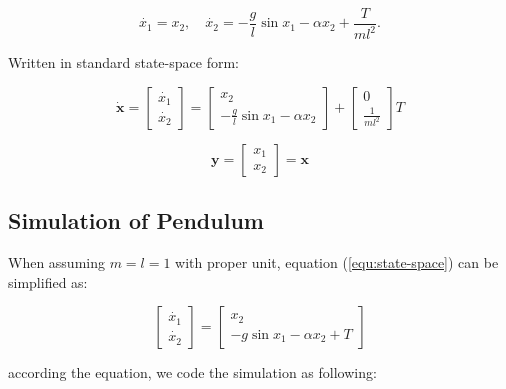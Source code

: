 \documentclass[titlepage]{article}
\begin{document}
\begin{equation}
    \dot{x_1} = x_2, \quad \dot{x_2} = - \frac{g}{l}\sin{x_1} -\alpha x_2 + \frac{T}{ml^2}.
\end{equation}

Written in standard state-space form:

\begin{equation}
    \bm{\dot{x}} = 
    \begin{bmatrix}
        \dot{x_1} \\ \dot{x_2}
    \end{bmatrix}
    =
    \begin{bmatrix}
        x_2 \\ -\frac{g}{l}\sin{x_1} - \alpha x_2
    \end{bmatrix}
    +
    \begin{bmatrix}
        0 \\ \frac{1}{ml^2}
    \end{bmatrix}
    T
    \label{equ:state-space}
\end{equation}

\begin{equation}
    \bm{y} = 
    \begin{bmatrix}
        x_1 \\ x_2
    \end{bmatrix}
    = \bm{x}
\end{equation}

\subsection{Simulation of Pendulum}

When assuming $m=l=1$ with proper unit, equation (\ref{equ:state-space}) can be simplified as:

\begin{equation}
    \begin{bmatrix}
        \dot{x_1} \\ \dot{x_2}
    \end{bmatrix}
    =
    \begin{bmatrix}
        x_2 \\ -g\sin{x_1} - \alpha x_2 + T
    \end{bmatrix}
\end{equation}

according the equation, we code the simulation as following:


\end{document}
